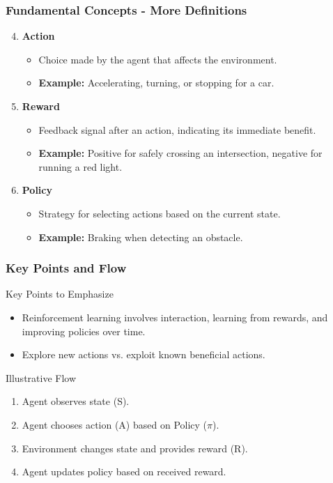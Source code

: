 \documentclass[aspectratio=169]{beamer}
\begin{document}
\begin{frame}[fragile]
    \frametitle{Fundamental Concepts - More Definitions}
    \begin{enumerate}
        \setcounter{enumi}{3} %
        \item \textbf{Action}
          \begin{itemize}
              \item Choice made by the agent that affects the environment.
              \item \textbf{Example:} Accelerating, turning, or stopping for a car.
          \end{itemize}
          
        \item \textbf{Reward}
          \begin{itemize}
              \item Feedback signal after an action, indicating its immediate benefit.
              \item \textbf{Example:} Positive for safely crossing an intersection, negative for running a red light.
          \end{itemize}
          
        \item \textbf{Policy}
          \begin{itemize}
              \item Strategy for selecting actions based on the current state.
              \item \textbf{Example:} Braking when detecting an obstacle.
          \end{itemize}
    \end{enumerate}
\end{frame}

\begin{frame}[fragile]
    \frametitle{Key Points and Flow}
    \begin{block}{Key Points to Emphasize}
        \begin{itemize}
            \item Reinforcement learning involves interaction, learning from rewards, and improving policies over time.
            \item Explore new actions vs. exploit known beneficial actions.
        \end{itemize}
    \end{block}
    
    \begin{block}{Illustrative Flow}
        \begin{enumerate}
            \item Agent observes state (S).
            \item Agent chooses action (A) based on Policy (\(\pi\)).
            \item Environment changes state and provides reward (R).
            \item Agent updates policy based on received reward.
        \end{enumerate}
    \end{block}
\end{frame}
\end{document}
